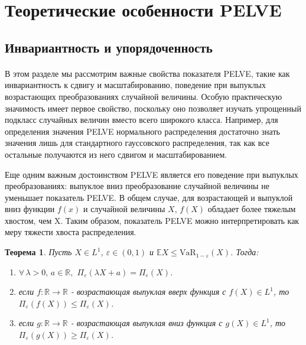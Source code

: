 \documentclass[12pt]{article}
\theoremstyle{plain}
\newtheorem{theorem}{Теорема}[section]
\theoremstyle{definition}
\theoremstyle{remark}
\begin{document}
\section{Теоретические особенности PELVE}
\subsection{Инвариантность и упорядоченность}
\paragraph{}
В этом разделе мы рассмотрим важные свойства показателя PELVE, такие как инвариантность к сдвигу и масштабированию, поведение при выпуклых возрастающих преобразованиях случайной величины. Особую практическую значимость имеет первое свойство, поскольку оно позволяет изучать упрощенный подкласс случайных величин вместо всего широкого класса. Например, для определения значения PELVE нормального распределения достаточно знать значения лишь для стандартного гауссовского распределения, так как все остальные получаются из него сдвигом и масштабированием.

Еще одним важным достоинством PELVE является его поведение при выпуклых преобразованиях: выпуклое вниз преобразование случайной величины не уменьшает показатель PELVE. В общем случае, для возрастающей и выпуклой вниз функции $f(x)$ и случайной величины $X$, $f(X)$ обладает более тяжелым хвостом, чем X. Таким образом, показатель PELVE можно интерпретировать как меру тяжести хвоста распределения.

\begin{theorem}
    Пусть $X \in L^1$, $\varepsilon \in (0, 1)$ и $\mathbb{E}X\leq \text{VaR}_{1-\varepsilon}(X)$. Тогда:
    \begin{enumerate}[label=(\roman*), font=\textit]
        \item $\forall \, \lambda>0,\, a \in \mathbb{R},$ $\Pi_\varepsilon(\lambda X+a) = \Pi_\varepsilon(X)$.
        \item если $f:\mathbb{R} \to \mathbb{R}$ - возрастающая выпуклая вверх функция с $f(X) \in L^1$, то $\Pi_\varepsilon(f(X))\leq \Pi_\varepsilon(X)$.
        \item если $g:\mathbb{R} \to \mathbb{R}$ - возрастающая выпуклая вниз функция с $g(X) \in L^1$, то $\Pi_\varepsilon(g(X))\geq \Pi_\varepsilon(X)$.
    \end{enumerate}
\end{theorem}
\end{document}
